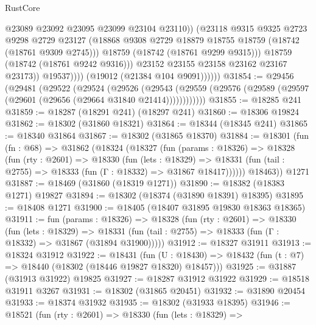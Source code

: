 \begin{lexlean}{RustCore}
\begin{coremodule}
                              @23089
                              @23092
                              @23095
                              @23099
                              @23104
                              @23110))
                          (@23118
                            @9315
                            @9325
                            @2723
                            @9298
                            @2729
                            @23127
                            (@18868 @9308 @2729 @18879 @18755 @18759 (@18742 (@18761 @9309 @2745)))
                            @18759
                            (@18742 (@18761 @9299 @9315)))
                          @18759
                          (@18742 (@18761 @9242 @9316)))
                        @23152
                        @23155
                        @23158
                        @23162
                        @23167
                        @23173))
                    @19537))))
            (@19012 (@21384 @104 @9091))))))
@31854 := @29456
    (@29481
      (@29522
        (@29524
          (@29526
            (@29543
              (@29559 (@29576 (@29589 (@29597 (@29601 (@29656 (@29664 @31840 @21414))))))))))))
@31855 := @18285 @241
@31859 := @18287 (@18291 @241) (@18297 @241)
@31860 := @18306 @19824
@31862 := @18302 (@31860 @18321)
@31864 := @18344 (@18345 @241)
@31865 := @18340 @31864
@31867 := @18302 (@31865 @18370)
@31884 := @18301
    (fun (fn : @68) =>
    @31862
      (@18324
        (@18327
          (fun (params : @18326) =>
          @18328
            (fun (rty : @2601) =>
            @18330
              (fun (lets : @18329) =>
              @18331 (fun (tail : @2755) => @18333 (fun (Γ : @18332) => @31867 @18417))))))
        @18463))
    @1271
@31887 := @18469 (@31860 (@18319 @1271))
@31890 := @18382 (@18383 @1271) @19827
@31894 := @18302 (@18374 (@31890 @18391) @18395)
@31895 := @18408 @1271
@31900 := @18405 (@18407 @31895 @19830 @18363 @18365)
@31911 := fun (params : @18326) =>
  @18328
    (fun (rty : @2601) =>
    @18330
      (fun (lets : @18329) =>
      @18331 (fun (tail : @2755) => @18333 (fun (Γ : @18332) => @31867 (@31894 @31900)))))
@31912 := @18327 @31911
@31913 := @18324 @31912
@31922 := @18431
    (fun (U : @18430) => @18432 (fun (t : @7) => @18440 (@18302 (@18446 @19827 @18320) @18457)))
@31925 := @31887 (@31913 @31922) @19825
@31927 := @18287 @31912 @31922
@31929 := @18518 @31911 @3267
@31931 := @18302 (@31865 @20451)
@31932 := @31890 @20454
@31933 := @18374 @31932
@31935 := @18302 (@31933 @18395)
@31946 := @18521
    (fun (rty : @2601) =>
    @18330
      (fun (lets : @18329) =>

\end{coremodule}
\end{lexlean}
